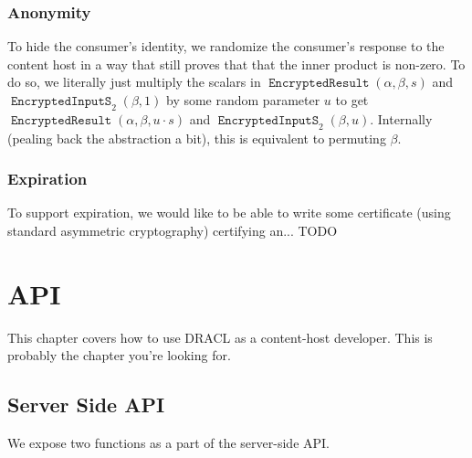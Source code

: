 \documentclass[pdftex,12pt,a4papaer,twoside,notitlepage]{report}
\DeclareMathOperator{\eins}{\mathtt{EncryptedInputS}}
\DeclareMathOperator{\eout}{\mathtt{EncryptedResult}}
\begin{document}
\subsection{Anonymity}

To hide the consumer's identity, we randomize the consumer's response to the
content host in a way that still proves that that the inner product is non-zero.
To do so, we literally just multiply the scalars in $\eout(\alpha, \beta, s)$
and $\eins_2(\beta, 1)$ by some random parameter $u$ to get $\eout(\alpha, \beta,
u \cdot s)$ and $\eins_2(\beta, u)$. Internally (pealing back the abstraction a
bit), this is equivalent to permuting $\beta$.

\subsection{Expiration}

To support expiration, we would like to be able to write some certificate (using
standard asymmetric cryptography) certifying an... TODO

\chapter{API}
\label{chap:api}

This chapter covers how to use DRACL as a content-host developer. This is
probably the chapter you're looking for.

\section{Server Side API}

We expose two functions as a part of the server-side API.
\end{document}
